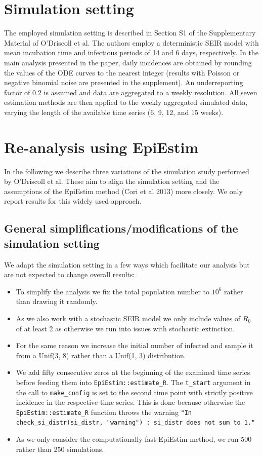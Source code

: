 \documentclass{article}
\begin{document}
\section{Simulation setting}

The employed simulation setting is described in Section S1 of the Supplementary Material of O'Driscoll et al. The authors employ a deterministic SEIR model with mean incubation time and infectious periods of 14 and 6 days, respectively. In the main analysis presented in the paper, daily incidences are obtained by rounding the values of the ODE curves to the nearest integer (results with Poisson or negative binomial noise are presented in the supplement). An underreporting factor of 0.2 is assumed and data are aggregated to a weekly resolution. All seven estimation methods are then applied to the weekly aggregated simulated data, varying the length of the available time series (6, 9, 12, and 15 weeks).

\section{Re-analysis using EpiEstim}

In the following we describe three variations of the simulation study performed by O'Driscoll et al. These aim to align the simulation setting and the assumptions of the EpiEstim method (Cori et al 2013) more closely. We only report results for this widely used approach.

\subsection{General simplifications/modifications of the simulation setting}

We adapt the simulation setting in a few ways which facilitate our analysis but are not expected to change overall results:
\begin{itemize}
\item To simplify the analysis we fix the total population number to $10^6$ rather than drawing it randomly.
\item As we also work with a stochastic SEIR model we only include values of $R_0$ of at least 2 as otherwise we run into issues with stochastic extinction.
\item For the same reason we increase the initial number of infected and sample it from a Unif(3, 8) rather than a Unif(1, 3) distribution.
\item We add fifty consecutive zeros at the beginning of the examined time series before feeding them into \texttt{EpiEstim::estimate\_R}. The \texttt{t\_start} argument in the call to \texttt{make\_config} is set to the second time point with strictly positive incidence in the respective time series. This is done because otherwise the \texttt{EpiEstim::estimate\_R} function throws the warning \texttt{"In check\_si\_distr(si\_distr, "warning") : si\_distr does not sum to 1."}
\item As we only consider the computationally fast EpiEstim method, we run 500 rather than 250 simulations.
\end{itemize}
\end{document}
